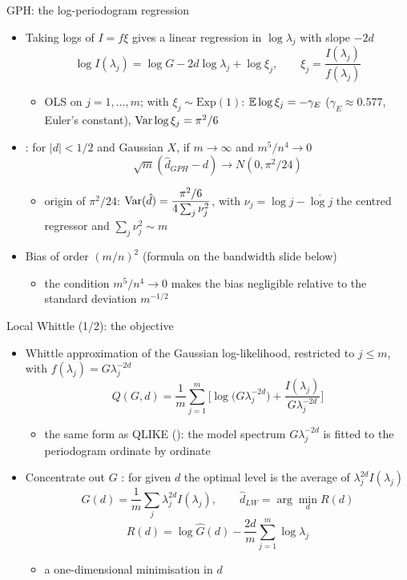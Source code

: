 \begin{frame}{GPH: the log-periodogram regression}
\itemsize{\small}
\begin{itemize}
    \item Taking logs of $I = f\xi$ gives a linear regression in $\log\lambda_j$ with slope $-2d$ 
    \[ \log I(\lambda_j) = \log G - 2d\log\lambda_j + \log\xi_j, \qquad \xi_j = \frac{I(\lambda_j)}{f(\lambda_j)} \]
    \begin{itemize}
        \item OLS on $j = 1, \dots, m$; with $\xi_j \sim \mathrm{Exp}(1)$: $\mathbb{E}\log\xi_j = -\gamma_E$ ($\gamma_E \approx 0.577$, Euler's constant), $\text{Var}\log\xi_j = \pi^2/6$
    \end{itemize}
    \item {}: for $|d| < 1/2$ and Gaussian $X$, if $m \to \infty$ and $m^5/n^4 \to 0$
    \[ \sqrt m(\hat d_{GPH} - d) \to N(0, \pi^2/24) \]
    \begin{itemize}
        \item origin of $\pi^2/24$: $\text{Var}(\hat d) = \dfrac{\pi^2/6}{4\sum_j\nu_j^2}$, with $\nu_j = \log j - \overline{\log j}$ the centred regressor and $\sum_j\nu_j^2 \sim m$
    \end{itemize}
    \item Bias of order $(m/n)^2$ (formula on the bandwidth slide below)
    \begin{itemize}
        \item the condition $m^5/n^4 \to 0$ makes the bias negligible relative to the standard deviation $m^{-1/2}$
    \end{itemize}
\end{itemize}
\end{frame}

\begin{frame}{Local Whittle (1/2): the objective}
\itemsize{\small}
\begin{itemize}
    \item Whittle approximation of the Gaussian log-likelihood, restricted to $j \le m$, with $f(\lambda_j) = G\lambda_j^{-2d}$
    \[ Q(G, d) = \frac1m\sum_{j=1}^m\Big[\log\big(G\lambda_j^{-2d}\big) + \frac{I(\lambda_j)}{G\lambda_j^{-2d}}\Big] \]
    \begin{itemize}
        \item the same form as QLIKE (): the model spectrum $G\lambda_j^{-2d}$ is fitted to the periodogram ordinate by ordinate
    \end{itemize}
    \item Concentrate out $G$ : for given $d$ the optimal level is the average of $\lambda_j^{2d}I(\lambda_j)$
    \[ \hat G(d) = \frac1m\sum_j\lambda_j^{2d}I(\lambda_j), \qquad \hat d_{LW} = \arg\min_d R(d) \]
    \[ R(d) = \log\hat G(d) - \frac{2d}{m}\sum_{j=1}^m\log\lambda_j \]
    \begin{itemize}
        \item a one-dimensional minimisation in $d$
    \end{itemize}
\end{itemize}
\end{frame}

